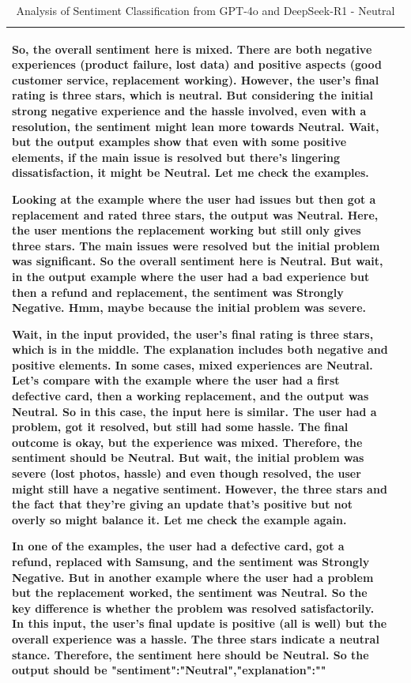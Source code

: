 \documentclass{IEEEcsmag}
\begin{document}
\begin{table}[htbp]
{\begin{tabular}{p{}|p{}}
So, the overall sentiment here is mixed. There are both negative experiences (product failure, lost data) and positive aspects (good customer service, replacement working). However, the user's final rating is three stars, which is neutral. But considering the initial strong negative experience and the hassle involved, even with a resolution, the sentiment might lean more towards Neutral. Wait, but the output examples show that even with some positive elements, if the main issue is resolved but there's lingering dissatisfaction, it might be Neutral. Let me check the examples. 

Looking at the example where the user had issues but then got a replacement and rated three stars, the output was Neutral. Here, the user mentions the replacement working but still only gives three stars. The main issues were resolved but the initial problem was significant. So the overall sentiment here is Neutral. But wait, in the output example where the user had a bad experience but then a refund and replacement, the sentiment was Strongly Negative. Hmm, maybe because the initial problem was severe.

Wait, in the input provided, the user's final rating is three stars, which is in the middle. The explanation includes both negative and positive elements. In some cases, mixed experiences are Neutral. Let's compare with the example where the user had a first defective card, then a working replacement, and the output was Neutral. So in this case, the input here is similar. The user had a problem, got it resolved, but still had some hassle. The final outcome is okay, but the experience was mixed. Therefore, the sentiment should be Neutral. But wait, the initial problem was severe (lost photos, hassle) and even though resolved, the user might still have a negative sentiment. However, the three stars and the fact that they're giving an update that's positive but not overly so might balance it. Let me check the example again. 

In one of the examples, the user had a defective card, got a refund, replaced with Samsung, and the sentiment was Strongly Negative. But in another example where the user had a problem but the replacement worked, the sentiment was Neutral. So the key difference is whether the problem was resolved satisfactorily. In this input, the user's final update is positive (all is well) but the overall experience was a hassle. The three stars indicate a neutral stance. Therefore, the sentiment here should be Neutral. So the output should be {"sentiment":"Neutral","explanation":""}\\
\hline
\end{tabular}
}
\caption{Analysis of Sentiment Classification from GPT-4o and DeepSeek-R1 - Neutral}
\label{tab:sentiment-analysis-neutral}
\end{table}
\end{document}
